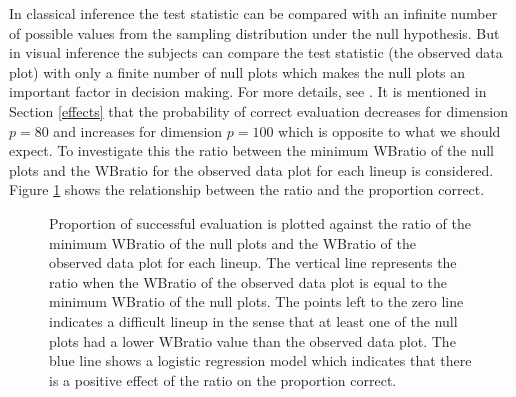 In classical inference the test statistic can be compared with an infinite number of possible values from the sampling distribution under the null hypothesis. But in visual inference the subjects can compare the test statistic (the observed data plot) with only a finite number of null plots which makes the null plots an important factor in decision making. For more details, see \cite{roychowdhury:2012}. It is mentioned in Section \ref{effects} that the probability of correct evaluation decreases for dimension $p = 80$ and increases for dimension $p = 100$ which is opposite to what we should expect. To investigate this the ratio between the minimum WBratio of the null plots and the WBratio for the observed data plot for each lineup is considered. 
Figure \ref{null} shows the relationship between the ratio and the proportion correct.  

\begin{figure}[hbtp]
   \centering
       \caption{Proportion of successful evaluation is plotted against the ratio of the minimum WBratio of the null plots and the WBratio of the observed data plot for each lineup. The vertical line represents the ratio when the WBratio of the observed data plot is equal to the minimum WBratio of the null plots. The points left to the zero line indicates a difficult lineup in the sense that at least one of the null plots had a lower WBratio value than the observed data plot. The blue line shows a logistic regression model which indicates that there is a positive effect of the ratio on the proportion correct.}
       \label{null}
\end{figure}

